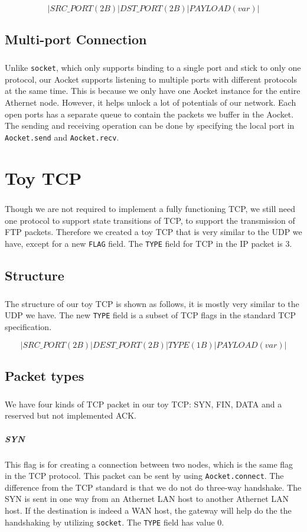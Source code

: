         $$| SRC\_PORT(2B) | DST\_PORT(2B) | PAYLOAD(var) |$$
    
    \subsection{Multi-port Connection}\label{sec:mulport}
        \subparagraph{}
        Unlike {\tt socket}, which only supports binding to a single port and stick to only one protocol, our Aocket supports listening to multiple ports with different protocols at the same time. This is because we only have one Aocket instance for the entire Athernet node. However, it helps unlock a lot of potentials of our network. Each open ports has a separate queue to contain the packets we buffer in the Aocket. The sending and receiving operation can be done by specifying the local port in {\tt Aocket.send} and {\tt Aocket.recv}.

\section{Toy TCP}
    \subparagraph{}
    Though we are not required to implement a fully functioning TCP, we still need one protocol to support state transitions of TCP, to support the transmission of FTP packets. Therefore we created a toy TCP that is very similar to the UDP we have, except for a new {\tt FLAG} field. The {\tt TYPE} field for TCP in the IP packet is 3.

    \subsection{Structure}
        \subparagraph{}
        The structure of our toy TCP is shown as follows, it is mostly very similar to the UDP we have. The new {\tt TYPE} field is a subset of TCP flags in the standard TCP specification.
        
        $$| SRC\_PORT(2B) | DEST\_PORT(2B) | TYPE(1B) | PAYLOAD(var) |$$
    
    \subsection{Packet types}
    
        \subparagraph{}
        We have four kinds of TCP packet in our toy TCP: SYN, FIN, DATA and a reserved but not implemented ACK.

        \subparagraph{SYN}
            This flag is for creating a connection between two nodes, which is the same flag in the TCP protocol. This packet can be sent by using {\tt Aocket.connect}. The difference from the TCP standard is that we do not do three-way handshake. The SYN is sent in one way from an Athernet LAN host to another Athernet LAN host. If the destination is indeed a WAN host, the gateway will help do the the handshaking by utilizing {\tt socket}. The {\tt TYPE} field has value 0.
            
